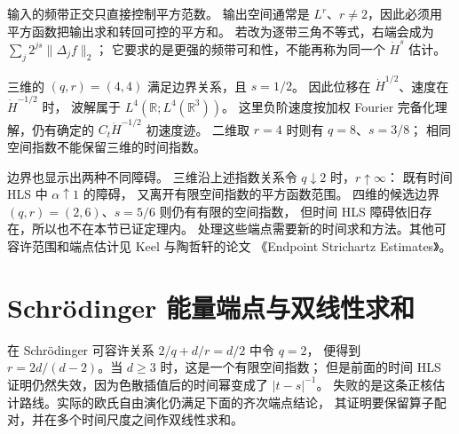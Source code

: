 
输入的频带正交只直接控制平方范数。
输出空间通常是 \(L^r\)、\(r\ne2\)，因此必须用平方函数把输出求和转回可控的平方和。
若改为逐带三角不等式，右端会成为
\(\sum_j2^{js}\|\Delta_jf\|_2\)；
它要求的是更强的频带可和性，不能再称为同一个 \(\dot H^s\) 估计。

\ProseParagraphBreak
三维的 \((q,r)=(4,4)\) 满足边界关系，且 \(s=1/2\)。
因此位移在 \(\dot H^{1/2}\)、速度在 \(\dot H^{-1/2}\) 时，
波解属于 \(L^4(\mathbb R;L^4(\mathbb R^3))\)。
这里负阶速度按加权 Fourier 完备化理解，仍有确定的
\(C_t\dot H^{-1/2}\) 初速度迹。
二维取 \(r=4\) 时则有 \(q=8\)、\(s=3/8\)；
相同空间指数不能保留三维的时间指数。

\ProseParagraphBreak
边界也显示出两种不同障碍。
三维沿上述指数关系令 \(q\downarrow2\) 时，\(r\uparrow\infty\)：
既有时间 HLS 中 \(\alpha\uparrow1\) 的障碍，
又离开有限空间指数的平方函数范围。
四维的候选边界 \((q,r)=(2,6)\)、\(s=5/6\) 则仍有有限的空间指数，
但时间 HLS 障碍依旧存在，所以也不在本节已证定理内。
处理这些端点需要新的时间求和方法。其他可容许范围和端点估计见 Keel 与陶哲轩的论文
《Endpoint Strichartz Estimates》\cite{Keel1998Endpoint}。

\section{Schrödinger 能量端点与双线性求和}

\label{b2:sec:app-E-4}

在 Schrödinger 可容许关系 \(2/q+d/r=d/2\) 中令 \(q=2\)，
便得到 \(r=2d/(d-2)\)。当 \(d\ge3\) 时，这是一个有限空间指数；
但是前面的时间 HLS 证明仍然失效，因为色散插值后的时间幂变成了 \(|t-s|^{-1}\)。
失败的是这条正核估计路线。实际的欧氏自由演化仍满足下面的齐次端点结论，
其证明要保留算子配对，并在多个时间尺度之间作双线性求和。

